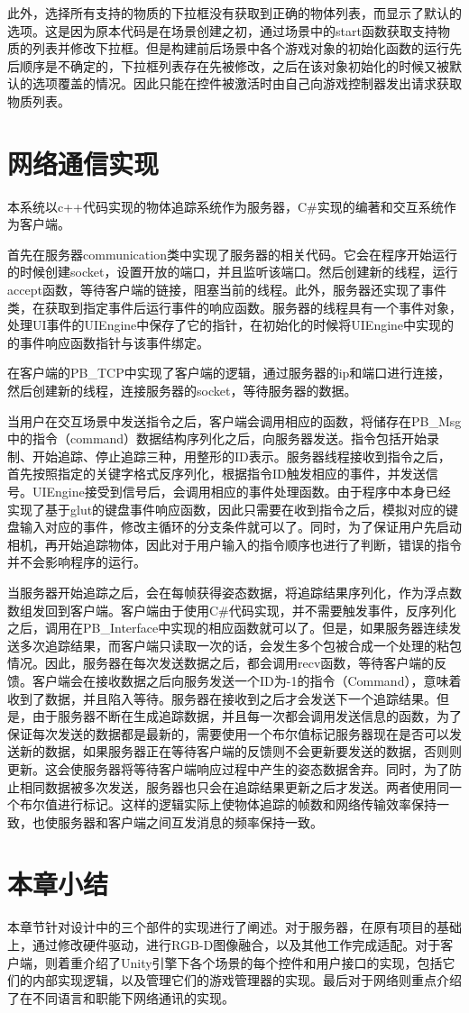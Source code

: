     此外，选择所有支持的物质的下拉框没有获取到正确的物体列表，而显示了默认的选项。这是因为原本代码是在场景创建之初，通过场景中的start函数获取支持物质的列表并修改下拉框。但是构建前后场景中各个游戏对象的初始化函数的运行先后顺序是不确定的，下拉框列表存在先被修改，之后在该对象初始化的时候又被默认的选项覆盖的情况。因此只能在控件被激活时由自己向游戏控制器发出请求获取物质列表。
    
\section{网络通信实现}

本系统以c++代码实现的物体追踪系统作为服务器，C\#实现的编著和交互系统作为客户端。

首先在服务器communication类中实现了服务器的相关代码。它会在程序开始运行的时候创建socket，设置开放的端口，并且监听该端口。然后创建新的线程，运行accept函数，等待客户端的链接，阻塞当前的线程。此外，服务器还实现了事件类，在获取到指定事件后运行事件的响应函数。服务器的线程具有一个事件对象，处理UI事件的UIEngine中保存了它的指针，在初始化的时候将UIEngine中实现的的事件响应函数指针与该事件绑定。

在客户端的PB\_TCP中实现了客户端的逻辑，通过服务器的ip和端口进行连接，然后创建新的线程，连接服务器的socket，等待服务器的数据。

当用户在交互场景中发送指令之后，客户端会调用相应的函数，将储存在PB\_Msg中的指令（command）数据结构序列化之后，向服务器发送。指令包括开始录制、开始追踪、停止追踪三种，用整形的ID表示。服务器线程接收到指令之后，首先按照指定的关键字格式反序列化，根据指令ID触发相应的事件，并发送信号。UIEngine接受到信号后，会调用相应的事件处理函数。由于程序中本身已经实现了基于glut的键盘事件响应函数，因此只需要在收到指令之后，模拟对应的键盘输入对应的事件，修改主循环的分支条件就可以了。同时，为了保证用户先启动相机，再开始追踪物体，因此对于用户输入的指令顺序也进行了判断，错误的指令并不会影响程序的运行。

当服务器开始追踪之后，会在每帧获得姿态数据，将追踪结果序列化，作为浮点数数组发回到客户端。客户端由于使用C\#代码实现，并不需要触发事件，反序列化之后，调用在PB\_Interface中实现的相应函数就可以了。但是，如果服务器连续发送多次追踪结果，而客户端只读取一次的话，会发生多个包被合成一个处理的粘包情况。因此，服务器在每次发送数据之后，都会调用recv函数，等待客户端的反馈。客户端会在接收数据之后向服务发送一个ID为-1的指令（Command），意味着收到了数据，并且陷入等待。服务器在接收到之后才会发送下一个追踪结果。但是，由于服务器不断在生成追踪数据，并且每一次都会调用发送信息的函数，为了保证每次发送的数据都是最新的，需要使用一个布尔值标记服务器现在是否可以发送新的数据，如果服务器正在等待客户端的反馈则不会更新要发送的数据，否则则更新。这会使服务器将等待客户端响应过程中产生的姿态数据舍弃。同时，为了防止相同数据被多次发送，服务器也只会在追踪结果更新之后才发送。两者使用同一个布尔值进行标记。这样的逻辑实际上使物体追踪的帧数和网络传输效率保持一致，也使服务器和客户端之间互发消息的频率保持一致。

\section{本章小结}
本章节针对设计中的三个部件的实现进行了阐述。对于服务器，在原有项目的基础上，通过修改硬件驱动，进行RGB-D图像融合，以及其他工作完成适配。对于客户端，则着重介绍了Unity引擎下各个场景的每个控件和用户接口的实现，包括它们的内部实现逻辑，以及管理它们的游戏管理器的实现。最后对于网络则重点介绍了在不同语言和职能下网络通讯的实现。

